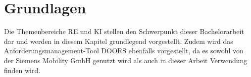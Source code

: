 \chapter{Grundlagen}
\label{chap:kapitel2}
Die Themenbereiche \ac{RE} und \ac{KI} stellen den Schwerpunkt dieser Bachelorarbeit dar und werden in diesem Kapitel grundlegend vorgestellt.
Zudem wird das Anforderungsmanagement-Tool \ac{DOORS} ebenfalls vorgestellt, da es sowohl von der Siemens Mobility GmbH genutzt wird als auch in dieser Arbeit Verwendung finden wird.





